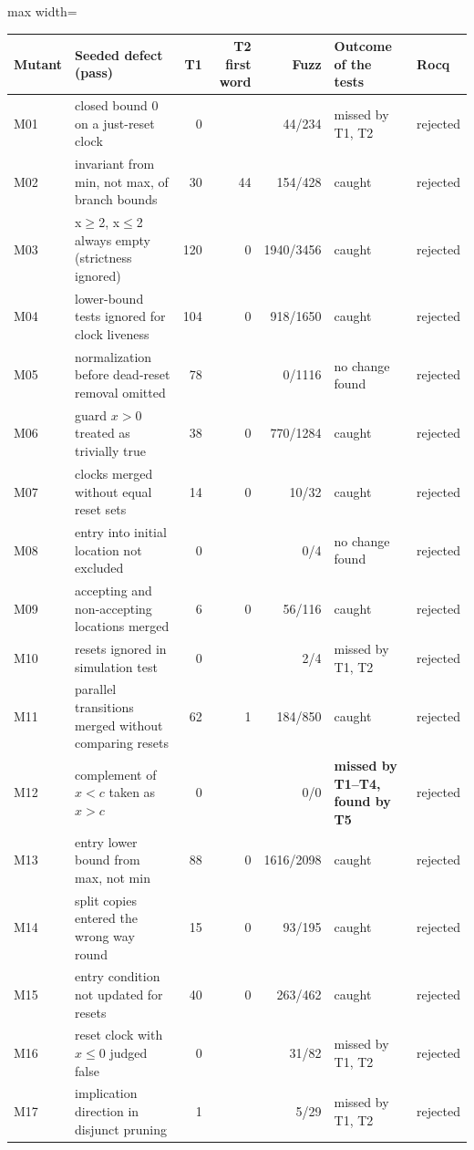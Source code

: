 \begin{adjustbox}{max width=\textwidth}\begin{tabular}{@{}lp{}rrrp{}l@{}}
\toprule
Mutant & Seeded defect (pass) & T1 & T2 first word & Fuzz & Outcome of the tests & Rocq \\
\midrule
M01 & closed bound 0 on a just-reset clock & 0 & \textemdash{} & 44/234 & missed by T1, T2 & rejected \\
M02 & invariant from min, not max, of branch bounds & 30 & 44 & 154/428 & caught & rejected \\
M03 & x$\ge$2, x$\le$2 always empty (strictness ignored) & 120 & 0 & 1940/3456 & caught & rejected \\
M04 & lower-bound tests ignored for clock liveness & 104 & 0 & 918/1650 & caught & rejected \\
M05 & normalization before dead-reset removal omitted & 78 & \textemdash{} & 0/1116 & no change found & rejected \\
M06 & guard $x>0$ treated as trivially true & 38 & 0 & 770/1284 & caught & rejected \\
M07 & clocks merged without equal reset sets & 14 & 0 & 10/32 & caught & rejected \\
M08 & entry into initial location not excluded & 0 & \textemdash{} & 0/4 & no change found & rejected \\
M09 & accepting and non-accepting locations merged & 6 & 0 & 56/116 & caught & rejected \\
M10 & resets ignored in simulation test & 0 & \textemdash{} & 2/4 & missed by T1, T2 & rejected \\
M11 & parallel transitions merged without comparing resets & 62 & 1 & 184/850 & caught & rejected \\
M12 & complement of $x<c$ taken as $x>c$ & 0 & \textemdash{} & 0/0 & \textbf{missed by T1--T4, found by T5} & rejected \\
M13 & entry lower bound from max, not min & 88 & 0 & 1616/2098 & caught & rejected \\
M14 & split copies entered the wrong way round & 15 & 0 & 93/195 & caught & rejected \\
M15 & entry condition not updated for resets & 40 & 0 & 263/462 & caught & rejected \\
M16 & reset clock with $x\le0$ judged false & 0 & \textemdash{} & 31/82 & missed by T1, T2 & rejected \\
M17 & implication direction in disjunct pruning & 1 & \textemdash{} & 5/29 & missed by T1, T2 & rejected \\

\end{tabular}
\end{adjustbox}
